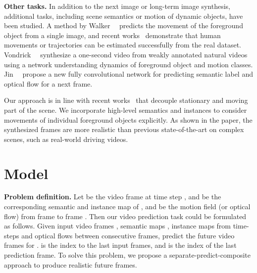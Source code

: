 \documentclass[10pt,twocolumn,letterpaper]{article}
\begin{document}
\vspace{2mm}
\noindent\textbf{Other tasks.}
In addition to the next image or long-term image synthesis, additional tasks, including scene semantics or motion of dynamic objects, have been studied. A method by Walker~\etal~\cite{Walker2016} predicts the movement of the foreground object from a single image, and recent works~\cite{Alahi2016, Bhattacharyya2018, Gupta2018, kitani2012activity, Ma2019, Yagi2018, Djuric2018, Sadeghian2018} demonstrate that human movements or trajectories can be estimated successfully from the real dataset. Vondrick~\etal~\cite{Vondrick2016} synthesize a one-second video from weakly annotated natural videos using a network understanding dynamics of foreground object and motion classes. Jin~\etal~\cite{jin2017predicting} propose a new fully convolutional network for predicting semantic label and optical flow for a next frame. 

Our approach is in line with recent works~\cite{denton2017unsupervised, villegas17mcnet, luo2017unsupervised, Qi2019} that decouple stationary and moving part of the scene. We incorporate high-level semantics and instances to consider movements of individual foreground objects explicitly. As shown in the paper, the synthesized frames are more realistic than previous state-of-the-art on complex scenes, such as real-world driving videos.


\section{Model}
\noindent\textbf{Problem definition.}
Let  be the video frame at time step ,  and  be the corresponding semantic and instance map of , and  be the motion field (or optical flow) from frame  to frame . Then our video prediction task could be formulated as follows. Given input video frames , semantic maps , instance maps  from time-steps  and optical flows between consecutive frames, predict the future video frames  for .  is the index to the last input frames, and  is the index of the last prediction frame. To solve this problem, we propose a separate-predict-composite approach to produce realistic future frames. 
\end{document}
